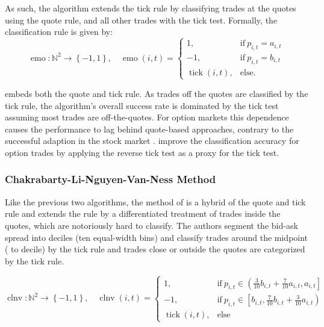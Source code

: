 As such, the  algorithm extends the tick rule by classifying trades at the quotes using the quote rule, and all other trades with the tick test. Formally, the classification rule is given by:
\begin{equation}
\operatorname{emo} \colon \mathbb{N}^2 \to \left\{-1, 1\right\}, \quad
\operatorname{emo}(i, t)=
\begin{cases}
1, & \text{if}\ p_{i, t} = a_{i, t} \\
-1,  & \text{if}\ p_{i, t} = b_{i, t} \\
\operatorname{tick}(i, t), & \text{else}.
\end{cases}
\label{eq:emo-rule}
\end{equation}

 embeds both the quote and tick rule. As trades off the quotes are classified by the tick rule, the algorithm's overall success rate is dominated by the tick test assuming most trades are off-the-quotes. For option markets \autocites[cp.][891]{savickasInferringDirectionOption2003}[][21]{grauerOptionTradeClassification2022} this dependence causes the performance to lag behind quote-based approaches, contrary to the successful adaption in the stock market \autocites[cp.][541]{ellisAccuracyTradeClassification2000}[][3818]{chakrabartyTradeClassificationAlgorithms2007}. \textcite[][31--35]{grauerOptionTradeClassification2022} improve the classification accuracy for option trades by applying the reverse tick test as a proxy for the tick test.

\subsubsection{Chakrabarty-Li-Nguyen-Van-Ness
Method}\label{sec:chakarabarty-li-nguyen-van-ness-method}

Like the previous two algorithms, the  method of \textcite[][3809]{chakrabartyTradeClassificationAlgorithms2012} is a hybrid of the quote and tick rule and extends the  rule by a differentiated treatment of trades inside the quotes, which are notoriously hard to classify. The authors segment the bid-ask spread into deciles (ten equal-width bins) and classify trades around the midpoint ( to  decile) by the tick rule and trades close or outside the quotes are categorized by the tick rule.

\begin{equation}
\operatorname{clnv} \colon \mathbb{N}^2 \to \left\{-1, 1\right\}, \quad
\operatorname{clnv}(i, t)=
\begin{cases}
1, & \text{if}\ p_{i, t} \in \left(\frac{3}{10} b_{i,t} + \frac{7}{10} a_{i,t}, a_{i, t}\right] \\
-1,  & \text{if}\ p_{i, t} \in \left[ b_{i,t}, \frac{7}{10} b_{i,t} + \frac{3}{10} a_{i,t}\right) \\
\operatorname{tick}(i, t), & \text{else}
\end{cases}
\label{eq:CLNV-rule}
\end{equation}

